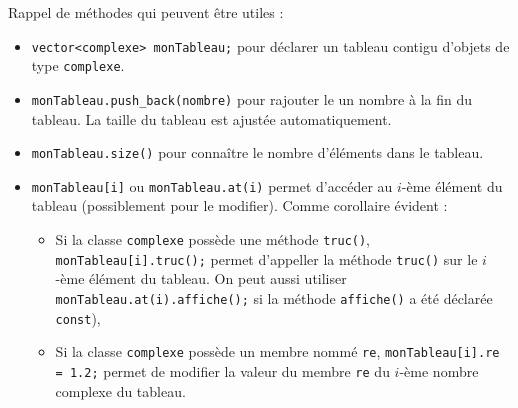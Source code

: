 \documentclass{book}
\newcommand{\inline}[1]{\texttt{#1}}
\begin{document}
Rappel de méthodes qui peuvent être utiles :
\begin{itemize}
  \item \inline{vector<complexe> monTableau;} pour déclarer un tableau contigu d'objets de type \inline{complexe}.
  \item \inline{monTableau.push_back(nombre)} pour rajouter le un nombre à la fin du tableau. La taille du tableau est ajustée automatiquement.
  \item \inline{monTableau.size()} pour connaître le nombre d'éléments dans le tableau.
  \item \inline{monTableau[i]} ou \inline{monTableau.at(i)} permet d'accéder au $i$-ème élément du tableau (possiblement pour le modifier). Comme corollaire évident :
  \begin{itemize}
    \item Si la classe \inline{complexe} possède une méthode \inline{truc()}, \inline{monTableau[i].truc();} permet d'appeller la méthode \inline{truc()} sur le $i$-ème élément du tableau. On peut aussi utiliser \inline{monTableau.at(i).affiche();} si la méthode \inline{affiche()} a été déclarée \inline{const}),
    \item Si la classe \inline{complexe} possède un membre nommé \inline{re}, \inline{monTableau[i].re = 1.2;} permet de modifier la valeur du membre \inline{re} du $i$-ème nombre complexe du tableau.
  \end{itemize}
\end{itemize}
 
\end{document}
